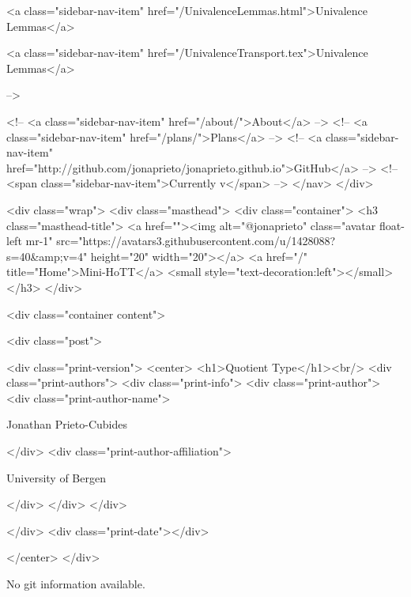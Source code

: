       
    
      
        
          <a class="sidebar-nav-item" href="/UnivalenceLemmas.html">Univalence Lemmas</a>
        
      
    
      
        
          <a class="sidebar-nav-item" href="/UnivalenceTransport.tex">Univalence Lemmas</a>
        
      
     -->

    <!-- <a class="sidebar-nav-item" href="/about/">About</a> -->
    <!-- <a class="sidebar-nav-item" href="/plans/">Plans</a> -->
    <!-- <a class="sidebar-nav-item" href="http://github.com/jonaprieto/jonaprieto.github.io">GitHub</a> -->
    <!-- <span class="sidebar-nav-item">Currently v</span> -->
  </nav>
</div>

    <div class="wrap">
      <div class="masthead">
        <div class="container">
          <h3 class="masthead-title">
            <a href=""><img alt="@jonaprieto" class="avatar float-left mr-1" src="https://avatars3.githubusercontent.com/u/1428088?s=40&amp;v=4" height="20" width="20"></a>
            <a href="/" title="Home">Mini-HoTT</a>
            <small style="text-decoration:left"></small>
          </h3>
        </div>
      
      <div class="container content">
        







<div class="post">

  <div class="print-version">
    <center>
      <h1>Quotient Type</h1><br/>
        <div class="print-authors">
          <div class="print-info">
            <div class="print-author">
              <div class="print-author-name">
                
                  Jonathan Prieto-Cubides
                
              </div>
              <div class="print-author-affiliation">
                
                  University of Bergen
                
                </div>
            </div>
          </div>
          
          
        </div>
        <div class="print-date"></div>
        
        
    </center>
  </div>

  
  No git information available.
  
